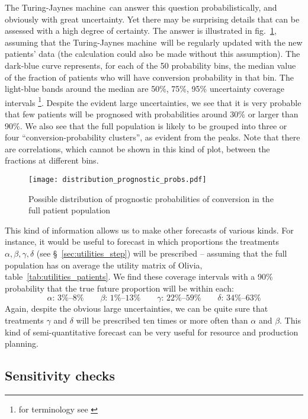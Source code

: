\documentclass[utf8]{FrontiersinHarvard} %
\newcommand*{\sect}{\S}%
\newcommand*{\fig}{fig.}%
\renewcommand*{\|}[1][]{\nonscript\:#1\vert\nonscript\:\mathopen{}}
\newcommand*{\tjm}{Turing-Jaynes machine}
\begin{document}
The \tjm\ can answer this question probabilistically, and obviously with great uncertainty. Yet there may be surprising details that can be assessed with a high degree of certainty. The answer is illustrated in \fig~\ref{fig:progn_probs}, assuming that the \tjm\ will be regularly updated with the new patients' data (the calculation could also be made without this assumption). The dark-blue curve represents, for each of the 50 probability bins, the median value of the fraction of patients who will have conversion probability in that bin. The light-blue bands around the median are 50\%, 75\%, 95\% uncertainty coverage intervals \footnote{for terminology see \citealp[C.2.30]{jcgm1993_r2008}}. Despite the evident large uncertainties, we see that it is very probable that few patients will be prognosed with probabilities around 30\% or larger than 90\%. We also see that the full population is likely to be grouped into three or four \enquote{conversion-probability clusters}, as evident from the peaks. Note that there are correlations, which cannot be shown in this kind of plot, between the fractions at different bins.
\begin{figure}[t]%
  \centering%
  \texttt{[image: distribution\_prognostic\_probs.pdf]}%
  \caption{Possible distribution of prognostic probabilities of conversion in the full patient population}\label{fig:progn_probs}
\end{figure}%

This kind of information allows us to make other forecasts of various kinds. For instance, it would be useful to forecast in which proportions the treatments $\alpha,\beta,\gamma,\delta$ (see \sect~\ref{sec:utilities_step}) will be prescribed -- assuming that the full population has on average the utility matrix of Olivia, table~\ref{tab:utilities_patients}. We find these coverage intervals with a 90\% probability that the true future proportion will be within each:
\begin{equation}
  \label{eq:ranges_future_treatments}
  \alpha\text{: 3\%--8\%}\qquad
  \beta\text{: 1\%--13\%}\qquad
  \gamma\text{: 22\%--59\%}\qquad
  \delta\text{: 34\%--63\%}
\end{equation}
Again, despite the obvious large uncertainties, we can be quite sure that treatments $\gamma$ and $\delta$ will be prescribed ten times or more often than $\alpha$ and $\beta$. This kind of semi-quantitative forecast can be very useful for resource and production planning.

\subsection{Sensitivity checks}
\label{sec:sensitivity}
\end{document}
